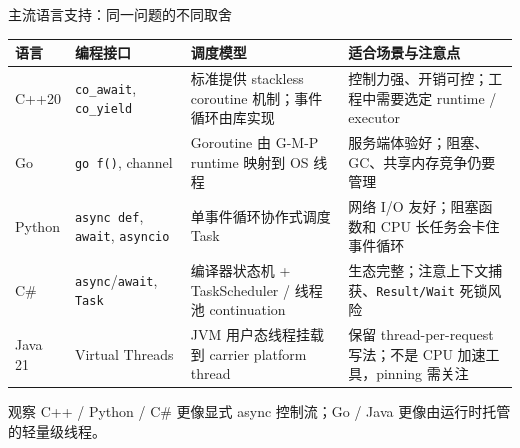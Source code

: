 \documentclass[UTF8,aspectratio=169,11pt]{ctexbeamer}
\begin{document}
\begin{frame}{主流语言支持：同一问题的不同取舍}
  \scriptsize
  \begin{tabularx}{\textwidth}{p{1.35cm}p{2.45cm}p{3.0cm}X}
    \toprule
    语言 & 编程接口 & 调度模型 & 适合场景与注意点 \\
    \midrule
    C++20 & \texttt{co\_await}, \texttt{co\_yield} & 标准提供 stackless coroutine 机制；事件循环由库实现 & 控制力强、开销可控；工程中需要选定 runtime / executor \\
    Go & \texttt{go f()}, channel & Goroutine 由 G-M-P runtime 映射到 OS 线程 & 服务端体验好；阻塞、GC、共享内存竞争仍要管理 \\
    Python & \texttt{async def}, \texttt{await}, \texttt{asyncio} & 单事件循环协作式调度 Task & 网络 I/O 友好；阻塞函数和 CPU 长任务会卡住事件循环 \\
    C\# & \texttt{async}/\texttt{await}, \texttt{Task} & 编译器状态机 + TaskScheduler / 线程池 continuation & 生态完整；注意上下文捕获、\texttt{Result/Wait} 死锁风险 \\
    Java 21 & Virtual Threads & JVM 用户态线程挂载到 carrier platform thread & 保留 thread-per-request 写法；不是 CPU 加速工具，pinning 需关注 \\
    \bottomrule
  \end{tabularx}

  \vspace{0.8em}
  \begin{block}{观察}
    C++ / Python / C\# 更像显式 async 控制流；Go / Java 更像由运行时托管的轻量级线程。
  \end{block}
\end{frame}
\end{document}
